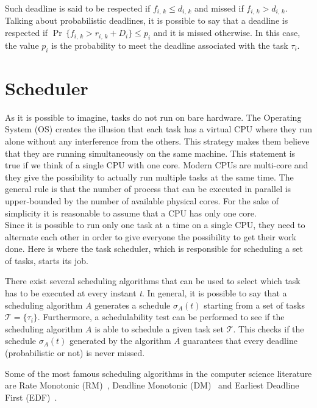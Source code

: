 Such deadline is said to be respected if \( f_{i,\,k} \leq d_{i,\,k} \) and missed
if \( f_{i,\,k} > d_{i,\,k} \). Talking about probabilistic deadlines, it is
possible to say that a deadline is respected if 
\( \Pr\,\{f_{i,\,k} > r_{i,\,k} + D_{i} \} \leq p_{i} \) and it is missed otherwise.
In this case, the value \( p_{i} \) is the probability to meet the deadline associated
with the task \( \tau_{i} \).

\section{Scheduler} \label{sec:scheduler}
As it is possible to imagine, tasks do not run on bare hardware.
The Operating System (OS) creates the illusion that each task has a virtual CPU
where they run alone without any interference from the others.
This strategy makes them believe that they are running simultaneously on the same
machine. This statement is true if we think of a single CPU with one core. Modern
CPUs are multi-core and they give the possibility to actually run multiple tasks
at the same time. The general rule is that the number of process that can be
executed in parallel is upper-bounded by the number of available physical cores.
For the sake of simplicity it is reasonable to assume that a CPU has only one core.\\
Since it is possible to run only one task at a time on a single CPU, they need
to alternate each other in order to give everyone the possibility to get their
work done. Here is where the task scheduler, which is responsible for
scheduling a set of tasks, starts its job.

There exist several scheduling algorithms that can be used to select which task 
has to be executed at every instant \emph{t}. In general, it is
possible to say that a scheduling algorithm \emph{A} generates a schedule
\( \sigma_{A}\left(t\right) \) starting from a set of tasks \( \mathcal{T} = \{\tau_{i}\} \).
Furthermore, a schedulability test can be performed to see if the scheduling
algorithm \( A \) is able to schedule a given task set \( \mathcal{T} \). This checks
if the schedule \( \sigma_{A}\left(t\right) \) generated by the algorithm \emph{A}
guarantees that every deadline (probabilistic or not) is never missed.

Some of the most famous scheduling algorithms in the computer science literature
are Rate Monotonic (RM)~\cite{lehoczky1989rate}, Deadline Monotonic
(DM)~\cite{audsley1991hard} and Earliest Deadline First (EDF)~\cite{jansen2003lightweight}.



